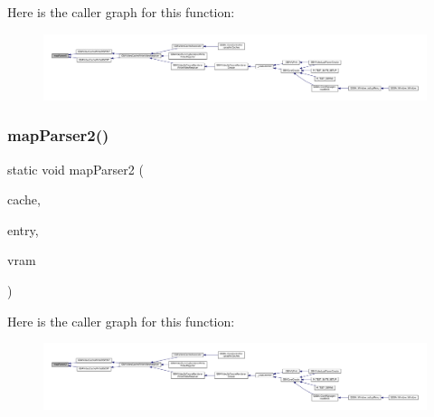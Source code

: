 Here is the caller graph for this function\+:
\nopagebreak
\begin{figure}[H]
\begin{center}
\leavevmode
\includegraphics[width=350pt]{gba_2renderers_2cache-set_8c_a51851b87bae33cac8355b4eedb326a96_icgraph}
\end{center}
\end{figure}
\mbox{\label{gba_2renderers_2cache-set_8c_a6bf5dc58738132b1eb88fc80abf14f2e}} 
\subsubsection{\texorpdfstring{map\+Parser2()}{mapParser2()}}
{\footnotesize\ttfamily static void map\+Parser2 (\begin{DoxyParamCaption}\item[{struct m\+Map\+Cache $\ast$}]{cache,  }\item[{struct m\+Map\+Cache\+Entry $\ast$}]{entry,  }\item[{void $\ast$}]{vram }\end{DoxyParamCaption})\hspace{0.3cm}{\ttfamily [static]}}

Here is the caller graph for this function\+:
\nopagebreak
\begin{figure}[H]
\begin{center}
\leavevmode
\includegraphics[width=350pt]{gba_2renderers_2cache-set_8c_a6bf5dc58738132b1eb88fc80abf14f2e_icgraph}
\end{center}
\end{figure}

